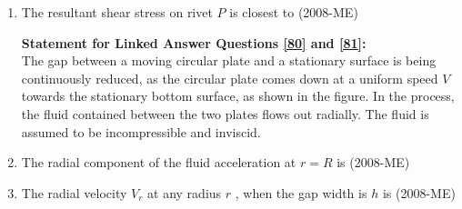 \documentclass[journal]{IEEEtran}
\begin{document}
\begin{enumerate}
\begin{enumerate}
 \end{enumerate}
 \item The resultant shear stress on rivet $P$
 is closest to \label{79} \hfill(2008-ME)
 \begin{enumerate}
 \end{enumerate}
\textbf{Statement for Linked Answer Questions \ref{80} and \ref{81}:} \\
The gap between a moving circular plate and a stationary surface is being continuously reduced, as the circular plate comes down at a uniform speed $V$
 towards the stationary bottom surface, as shown in the figure. In the process, the fluid contained between the two plates flows out radially. The fluid is assumed to be incompressible and inviscid. 
 
 \item The radial component of the fluid acceleration at $r = R$
 is \label{80} \hfill(2008-ME)
 \begin{enumerate}
 \end{enumerate}
\item The radial velocity $V_r$
 at any radius $r$
, when the gap width is $h$
 is \label{81} \hfill(2008-ME)
 \begin{enumerate}

\end{enumerate}
\end{enumerate}
\end{document}
